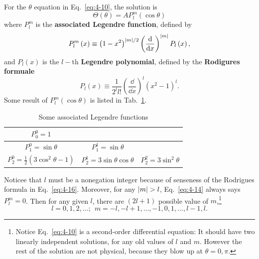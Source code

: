 For the $\theta$ equation in Eq.~\eqref{eq:4-10}, the solution is
\begin{equation}
  \label{eq:4-14}
  \Theta \left( \theta \right) = A P_{l}^{m} \left(\cos \theta \right)
\end{equation}
where $P_{l}^m$ is the \textbf{associated Legendre function}, defined by
\begin{equation}
  \label{eq:4-15}
  P_l^m \left( x \right) \equiv \left( 1-x^2 \right)^{\abs{m}/2} \left( \frac{\dd}{\dd x} \right)^{\abs{m}} P_l \left( x \right) ,
\end{equation}
and $P_l \left( x \right)$ is the $l-$th \textbf{Legendre polynomial}, defined by the \textbf{Rodigures formuale}
\begin{equation}
  \label{eq:4-16}
  P_l \left( x \right) \equiv \frac{1}{2^{l} l!} \left( \frac{\dd}{\dd x} \right)^l \left( x^2 -1 \right)^l.
\end{equation}
Some result of $P_l^m \left( \cos \theta \right)$ is listed in Tab.~\ref{tab:4-1}.
\begin{table}[h]
  \centering
  \begin{tabular}{c c c}
    \toprule
    $P_0^0 = 1$ &  &  \\
    \midrule
    $P_1^0 = \sin \theta$ & $P_1^1= \sin \theta$ & \\
    \midrule
    $P_2^0 = \frac{1}{2} \left( 3 \cos^2 \theta -1 \right)$ & $P_2^1 = 3\sin \theta \cos \theta$ & $P_2^2 = 3 \sin^2\theta$ \\
    \bottomrule
  \end{tabular}
  \caption{Some associated Legendre functions}
  \label{tab:4-1}
\end{table}
Noticee that $l$ must be a nonegation integer because of senseness of the Rodrigues formula in Eq.~\eqref{eq:4-16}.
Moreover, for any $\abs{m}>l$, Eq.~\eqref{eq:4-14} always says $P_l^m=0$.
Then for any given $l$, there are $\left( 2l+1 \right)$ possible value of $m$,\footnote{Notice Eq.~\eqref{eq:4-10} is a second-order differential equation: It should have two linearly independent solutions, for any old values of $l$ and $m$. However the rest of the solution are not physical, because they blow up at $\theta=0, \pi$.}
\begin{equation}
  \label{eq:4-17}
  l = 0, 1, 2, \ldots; ~ ~ m = -l, -l+1, \ldots, -1, 0, 1, \ldots, l-1, l.
\end{equation}

